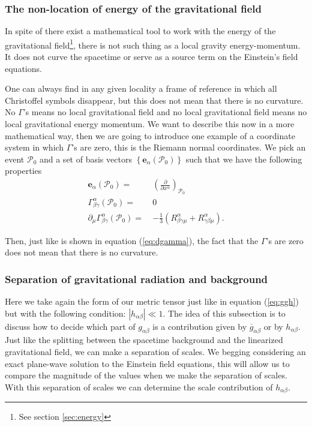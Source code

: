 \subsubsection{The non-location of energy of the gravitational field}

In spite of there exist a mathematical tool to work with the energy
of the gravitational field\footnote{See section \ref{sec:energy}},
there is not such thing as a local gravity energy-momentum. It does
not curve the spacetime or serve as a source term on the Einstein's
field equations.

One can always find in any given locality a frame of reference in
which all Christoffel symbols disappear, but this does not mean that
there is no curvature. No $\Gamma$'s means no local gravitational
field and no local gravitational field means no local gravitational
energy momentum. We want to describe this now in a more mathematical
way, then we are going to introduce one example of a coordinate system
in which $\Gamma$'s are zero, this is the Riemann normal coordinates.
We pick an event $\mathcal{P}_{0}$ and a set of basis vectors $\left\{ \boldsymbol{e}_{\alpha}\left(\mathcal{P}_{0}\right)\right\} $
such that we have the following properties
\begin{align}
\boldsymbol{e}_{\alpha}\left(\mathcal{P}_{0}\right)=\  & {\displaystyle \left(\frac{\partial}{\partial x^{\alpha}}\right)_{\mathcal{P}_{0}}}\\
\Gamma_{\beta\gamma}^{\alpha}\left(\mathcal{P}_{0}\right)=\  & 0\\
\partial_{\mu}\Gamma_{\beta\gamma}^{\alpha}\left(\mathcal{P}_{0}\right)=\  & {\displaystyle -\frac{1}{3}\left(R_{\beta\gamma\mu}^{\alpha}+R_{\gamma\beta\mu}^{\alpha}\right)}.\label{eq:dgamma}
\end{align}

Then, just like is shown in equation (\ref{eq:dgamma}), the fact
that the $\Gamma$'s are zero does not mean that there is no curvature.

\subsubsection{Separation of gravitational radiation and background}

Here we take again the form of our metric tensor just like in equation
(\ref{eq:ggh}) but with the following condition: $\left|h_{\alpha\beta}\right|\ll1$.
The idea of this subsection is to discuss how to decide which part
of $g_{\alpha\beta}$ is a contribution given by $\overline{g}_{\alpha\beta}$
or by $h_{\alpha\beta}$. Just like the splitting between the spacetime
background and the linearized gravitational field, we can make a separation
of scales. We begging considering an exact plane-wave solution to
the Einstein field equations, this will allow us to compare the magnitude
of the values when we make the separation of scales. With this separation
of scales we can determine the scale contribution of $h_{\alpha\beta}$.

